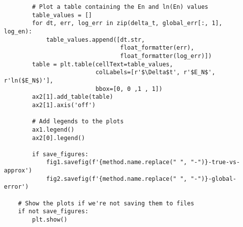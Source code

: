\documentclass{article}
\begin{document}
\begin{verbatim}
        # Plot a table containing the En and ln(En) values
        table_values = []
        for dt, err, log_err in zip(delta_t, global_err[:, 1], log_en):
            table_values.append([dt.str,
                                 float_formatter(err),
                                 float_formatter(log_err)])
        table = plt.table(cellText=table_values,
                          colLabels=[r'$\Delta$t', r'$E_N$', r'ln($E_N$)'],
                          bbox=[0, 0 ,1 , 1])
        ax2[1].add_table(table)
        ax2[1].axis('off')
    
        # Add legends to the plots
        ax1.legend()
        ax2[0].legend()
    
        if save_figures:
            fig1.savefig(f'{method.name.replace(" ", "-")}-true-vs-approx')
            fig2.savefig(f'{method.name.replace(" ", "-")}-global-error')
    
    # Show the plots if we're not saving them to files
    if not save_figures:
        plt.show()
\end{verbatim}
\end{document}
